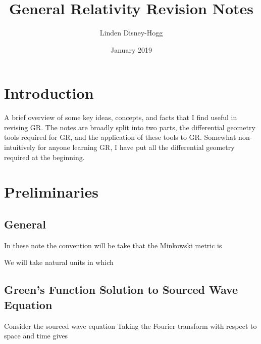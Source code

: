 \documentclass{article}
\title{General Relativity Revision Notes}
\author{Linden Disney-Hogg}
\date{January 2019}
\begin{document}
\maketitle
\tableofcontents

\section{Introduction}
A brief overview of some key ideas, concepts, and facts that I find useful in revising GR. The notes are broadly split into two parts, the differential geometry tools required for GR, and the application of these tools to GR. Somewhat non-intuitively for anyone learning GR, I have put all the differential geometry required at the beginning.
\section{Preliminaries}
\subsection{General}

\begin{definition}
In these note the convention will be take that the Minkowski metric is 
\end{definition}

\begin{definition}
We will take natural units in which 
\end{definition}
\subsection{Green's Function Solution to Sourced Wave Equation}
Consider the sourced wave equation 
Taking the Fourier transform with respect to space and time 
gives 
\end{document}
